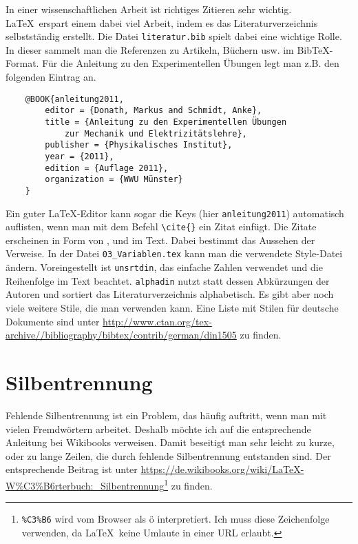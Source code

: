 In einer wissenschaftlichen Arbeit ist richtiges Zitieren sehr wichtig. \LaTeX\ erspart einem dabei viel Arbeit, indem es das Literaturverzeichnis selbstständig erstellt. Die Datei \verb|literatur.bib| spielt dabei eine wichtige Rolle. In dieser sammelt man die Referenzen zu Artikeln, Büchern usw. im BibTeX-Format. Für die Anleitung zu den Experimentellen Übungen legt man z.B. den folgenden Eintrag an.

\begin{verbatim}
    @BOOK{anleitung2011,
        editor = {Donath, Markus and Schmidt, Anke},
        title = {Anleitung zu den Experimentellen Übungen
            zur Mechanik und Elektrizitätslehre},
        publisher = {Physikalisches Institut},
        year = {2011},
        edition = {Auflage 2011},
        organization = {WWU Münster}
    }
\end{verbatim}


Ein guter \LaTeX-Editor kann sogar die Keys (hier \verb|anleitung2011|) automatisch auflisten, wenn man mit dem Befehl \verb|\cite{}| ein Zitat einfügt. Die Zitate erscheinen in Form von \cite{heil2012}, \cite{anleitung2012} und \cite{anleitung2013} im Text. Dabei bestimmt \verb|| das Aussehen der Verweise. In der Datei \verb|03_Variablen.tex| kann man die verwendete Style-Datei ändern. Voreingestellt ist \verb|unsrtdin|, das einfache Zahlen verwendet und die Reihenfolge im Text beachtet. \verb|alphadin| nutzt statt dessen Abkürzungen der Autoren und sortiert das Literaturverzeichnis alphabetisch. Es gibt aber noch viele weitere Stile, die man verwenden kann. Eine Liste mit Stilen für deutsche Dokumente sind unter \url{http://www.ctan.org/tex-archive//bibliography/bibtex/contrib/german/din1505} zu finden.

\section{Silbentrennung}

Fehlende Silbentrennung ist ein Problem, das häufig auftritt, wenn man mit vielen Fremdwörtern arbeitet. Deshalb möchte ich auf die entsprechende Anleitung bei Wikibooks verweisen. Damit beseitigt man sehr leicht zu kurze, oder zu lange Zeilen, die durch fehlende Silbentrennung entstanden sind. Der entsprechende Beitrag ist unter \url{https://de.wikibooks.org/wiki/LaTeX-W\%C3\%B6rterbuch:_Silbentrennung}\footnote{\texttt{\%C3\%B6} wird vom Browser als ö interpretiert. Ich muss diese Zeichenfolge verwenden, da \LaTeX\ keine Umlaute in einer URL erlaubt.} zu finden.

